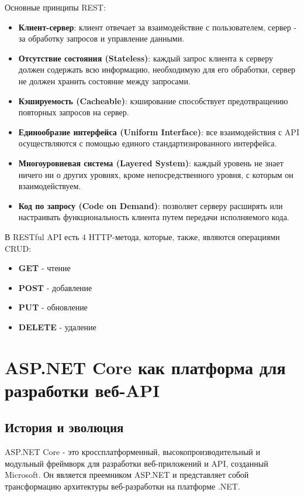\documentclass[a4paper,12pt]{report}
\begin{document}
Основные принципы \acs{REST}:
\begin{itemize}
    \item
        \textbf{Клиент-сервер}: клиент отвечает за взаимодействие с пользователем, сервер - за обработку запросов и управление данными.
    \item 
        \textbf{Отсутствие состояния (Stateless)}: каждый запрос клиента к серверу должен содержать всю информацию, необходимую для его обработки, 
        сервер не должен хранить состояние между запросами.
    \item
        \textbf{Кэшируемость (Cacheable)}: кэширование способствует предотвращению повторных запросов на сервер.
    \item
        \textbf{Единообразие интерфейса (Uniform Interface)}: все взаимодействия с API осуществляются с помощью единого стандартизированного интерфейса.
    \item
        \textbf{Многоуровневая система (Layered System)}: каждый уровень не знает ничего ни о других уровнях, кроме непосредственного уровня, с которым он взаимодействуем.
    \item
        \textbf{Код по запросу (Code on Demand)}: позволяет серверу расширять или настраивать функциональность клиента путем передачи исполняемого кода.
\end{itemize}

В \acs{REST}ful \acs{API} есть 4 \acs{HTTP}-метода, которые, также, являются операциями \acs{CRUD}:
\begin{itemize}
    \item
        \textbf{GET} - чтение
    \item 
        \textbf{POST} - добавление
    \item
        \textbf{PUT} - обновление
    \item
        \textbf{DELETE} - удаление
\end{itemize}

\section{ASP.NET Core как платформа для разработки веб-\acs{API}}

\subsection{История и эволюция}
ASP.NET Core - это кроссплатформенный, высокопроизводительный и модульный фреймворк для разработки веб-приложений и \acs{API}, созданный Microsoft. 
Он является преемником ASP.NET и представляет собой трансформацию архитектуры веб-разработки на платформе .NET.
\end{document}
